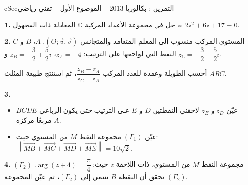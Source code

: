 \documentclass[12pt,a4paper]{article}
\newenvironment{BOX}[2]{\begin{otherlanguage}{english}\begin{arbox}{#1}{#2}}{\end{arbox}\end{otherlanguage}}
\newcounter{exo}
\newenvironment{tamrin}[1]{\stepcounter{exo}\begin{BOX}{cSec}{التمرين \theexo: #1}}{\end{BOX}}
\newenvironment{sq}{\begin{itemize}[leftmargin=2.4em,itemsep=3pt]}{\end{itemize}}
\newcommand{\qa}{\item[(أ)]}\newcommand{\qb}{\item[(ب)]}\newcommand{\qc}{\item[(جـ)]}\newcommand{\qd}{\item[(د)]}\newcommand{\qe}{\item[(هـ)]}
\newcommand{\QQ}[1]{\par\smallskip\textbf{#1.} }
\begin{document}
\begin{tamrin}{بكالوريا 2013 -- الموضوع الأول -- تقني رياضي}
\QQ{1} حل في مجموعة الأعداد المركبة $\mathbb{C}$ المعادلة ذات المجهول $z$: $2z^2+6z+17=0$.
\QQ{2} المستوي المركب منسوب إلى المعلم المتعامد والمتجانس $(O;\vec u,\vec v)$.
$A$، $B$ و $C$ النقط التي لواحقها على الترتيب: $z_A=-4$، $z_B=-\dfrac32+\dfrac52 i$ و $z_C=-\dfrac32-\dfrac52 i$.

أحسب الطويلة وعمدة للعدد المركب $\dfrac{z_B-z_A}{z_C-z_A}$، ثم استنتج طبيعة المثلث $ABC$.
\QQ{3}
\begin{sq}
\qa عيّن $z_D$ و $z_E$ لاحقتي النقطتين $D$ و $E$ على الترتيب حتى يكون الرباعي $BCDE$ مربعًا مركزه $A$.
\qb عيّن $(\Gamma_1)$ مجموعة النقط $M$ من المستوي حيث: $\left\|\overrightarrow{MB}+\overrightarrow{MC}+\overrightarrow{MD}+\overrightarrow{ME}\right\|=10\sqrt2$.
\end{sq}
\QQ{4} $(\Gamma_2)$ مجموعة النقط $M$ من المستوي، ذات اللاحقة $z$ حيث: $\arg(z+4)=\dfrac{\pi}{4}$.
تحقق أن النقطة $B$ تنتمي إلى $(\Gamma_2)$، ثم عيّن المجموعة $(\Gamma_2)$.
\end{tamrin}
\end{document}
